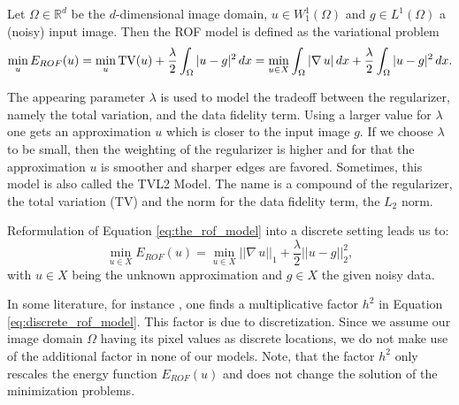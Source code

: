     \begin{definition} %
    \label{def:the_rof_model}

        Let $\Omega \in \mathbb{R}^{d}$ be the $d$-dimensional image domain, $u \in W_{1}^{1}(\Omega)$ and $g \in L^{1}(\Omega)$ a (noisy) input image. Then the ROF model is defined as the variational problem
            \begin{equation}
                \min_{u} E_{ROF}(u) = \min_{u} \textnormal{TV}(u) + \frac{\lambda}{2} \int_{\Omega} |u - g|^{2} \, dx = \min_{u \in X} \int_{\Omega} |\nabla \, u| \, dx + \frac{\lambda}{2} \int_{\Omega} |u - g|^{2} \, dx.
                \label{eq:the_rof_model}
            \end{equation}

    \end{definition}

    The appearing parameter $\lambda$ is used to model the tradeoff between the regularizer, namely the total variation, and the data fidelity term. Using a larger value for $\lambda$ one gets an approximation $u$ which is closer to the input image $g$. If we choose $\lambda$ to be small, then the weighting of the regularizer is higher and for that the approximation $u$ is smoother and sharper edges are favored. Sometimes, this model is also called the TVL2 Model. The name is a compound of the regularizer, the total variation (TV) and the norm for the data fidelity term, the $L_{2}$ norm.

    Reformulation of Equation \ref{eq:the_rof_model} into a discrete setting leads us to:
        \begin{equation}
            \min_{u \in X} E_{ROF}(u) = \min_{u \in X} ||\nabla \, u||_{1} + \frac{\lambda}{2} ||u - g||_{2}^{2},
        \label{eq:discrete_rof_model}
        \end{equation}
    with $u \in X$ being the unknown approximation and $g \in X$ the given noisy data.

    \begin{remark} %
        In some literature, for instance \cite{Chambolle10afirst-order}, one finds a multiplicative factor $h^{2}$ in Equation \ref{eq:discrete_rof_model}. This factor is due to discretization. Since we assume our image domain $\Omega$ having its pixel values as discrete locations, we do not make use of the additional factor in none of our models. Note, that the factor $h^{2}$ only rescales the energy function $E_{ROF}(u)$ and does not change the solution of the minimization problems.
    \end{remark}

